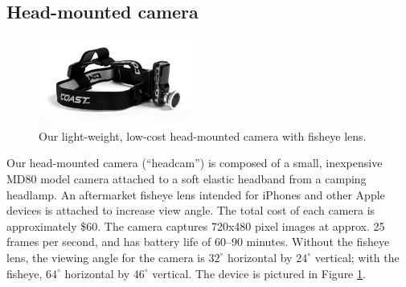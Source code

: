 \documentclass[man,noapacite]{apa2}
\begin{document}

\subsection{Head-mounted camera}

\begin{figure}
\centering
\includegraphics[width=2in]{figures/headcam_w_fisheye3.jpg}
\caption{\label{fig:headcam} Our light-weight, low-cost head-mounted camera with fisheye lens.} 
\end{figure}

Our head-mounted camera (``headcam'') is composed of a small, inexpensive MD80 model camera attached to a soft elastic headband from a camping headlamp. An aftermarket fisheye lens intended for iPhones and other Apple devices is attached to increase view angle. The total cost of each camera is approximately \$60. The camera captures 720x480 pixel images at approx. 25 frames per second, and has battery life of 60--90 minutes. Without the fisheye lens, the viewing angle for the camera is $32^{\circ}$ horizontal by $24^{\circ}$ vertical; with the fisheye, $64^{\circ}$ horizontal by $46^{\circ}$ vertical. The device is pictured in Figure \ref{fig:headcam}.
\end{document}
